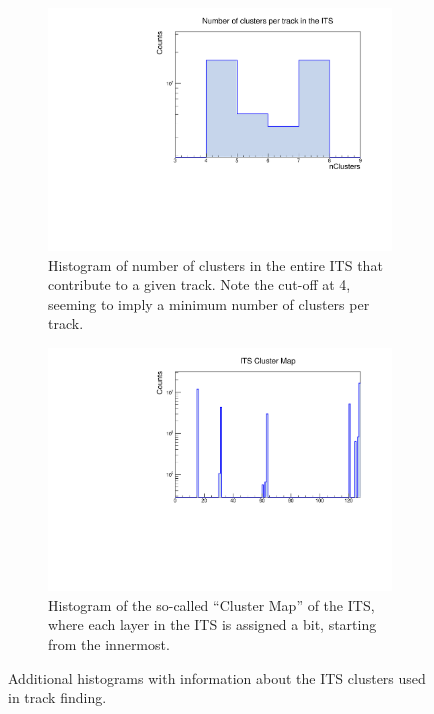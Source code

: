 \begin{figure}[h]%
    \centering
    \begin{subfigure}[t]{.49\linewidth}
        \centering
        \includegraphics[width=\linewidth]{Plots/pass4_TracksIU/itsNCls.pdf}
        \caption{Histogram of number of clusters in the entire ITS that contribute to a given track. Note the cut-off at 4, seeming to imply a minimum number of clusters per track.}
        \label{fig:ITS_NCls}
    \end{subfigure}
    \hfill
    \begin{subfigure}[t]{.49\linewidth}
        \centering
        \includegraphics[width=\linewidth]{Plots/pass4_TracksIU/itsClusterMap.pdf}
        \caption{Histogram of the so-called ``Cluster Map'' of the ITS, where each layer in the ITS is assigned a bit, starting from the innermost.}
        \label{fig:ITS_ClusterMap}
    \end{subfigure}
\caption[Histograms of cluster information for tracks in the ITS]{Additional histograms with information about the ITS clusters used in track finding.}
\label{fig:ITS_Clusters}
\end{figure}

